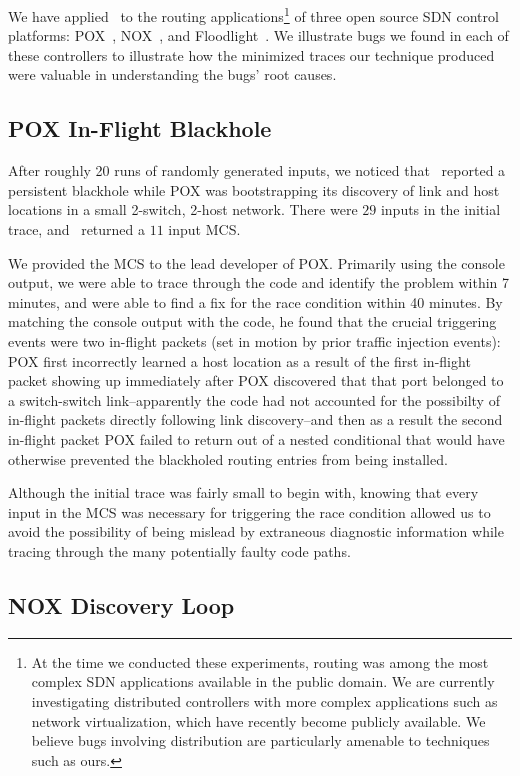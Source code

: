 We have applied \projectname~to the routing applications\footnote{At the time
we conducted these experiments, routing was among the most complex
SDN applications available in the public domain. We are currently investigating
distributed controllers with more complex applications such as network virtualization,
which have recently become publicly available. We believe bugs involving
distribution are particularly amenable to techniques such as ours.} of three open
source SDN control platforms:
POX~\cite{pox}, NOX~\cite{nox}, and Floodlight~\cite{bigswitch}. We illustrate
bugs we found in each of these controllers to illustrate
how the minimized traces our technique produced were valuable in
understanding the bugs' root causes.

\subsection{POX In-Flight Blackhole}
After roughly 20 runs of randomly generated inputs,
we noticed that \projectname~reported a persistent blackhole while
POX was bootstrapping its
discovery of link and host locations in a small 2-switch, 2-host network.
There were $29$ inputs in the initial trace, and \simulator~returned a $11$ input
MCS.

We provided the MCS to the lead developer of POX. Primarily using the
console output, we were able to trace through the code and identify the problem
within 7 minutes, and were able to find a fix for the race condition within 40
minutes. By matching the console output with the code, he found that the crucial
triggering events were two
in-flight packets (set in motion by prior traffic injection events):
POX first incorrectly learned a host location as a result of the first in-flight
packet showing up immediately after POX discovered that that port belonged to
a switch-switch link--apparently the code had not accounted for the
possibilty of in-flight packets directly following link discovery--and
then as a result the
second in-flight packet
POX failed to return out of a nested conditional that would have
otherwise prevented the blackholed routing entries from being installed.

Although the initial trace was fairly small to begin with, knowing that every
input in the MCS was necessary for triggering the race condition allowed us to
avoid the
possibility of being mislead by extraneous diagnostic information while
tracing through the many potentially faulty code paths.

\subsection{NOX Discovery Loop}

